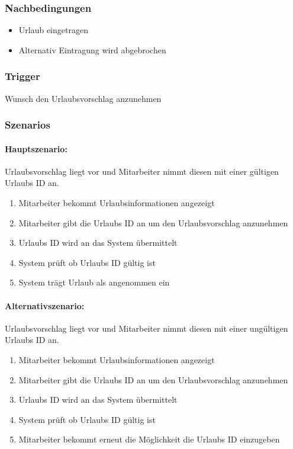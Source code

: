 \subsubsection{Nachbedingungen}
\begin{itemize}
	\item Urlaub eingetragen
	\item Alternativ Eintragung wird abgebrochen
\end{itemize}

\subsubsection{Trigger}
Wunsch den Urlaubsvorschlag anzunehmen

\subsubsection{Szenarios}
\paragraph{Hauptszenario:}
Urlaubsvorschlag liegt vor und Mitarbeiter nimmt diesen mit einer gültigen Urlaubs ID an.

\begin{enumerate}
	\item Mitarbeiter bekommt Urlaubsinformationen angezeigt
	\item Mitarbeiter gibt die Urlaubs ID an um den Urlaubsvorschlag anzunehmen
	\item Urlaubs ID wird an das System übermittelt
	\item System prüft ob Urlaubs ID gültig ist
	\item System trägt Urlaub als angenommen ein
\end{enumerate}



\paragraph{Alternativszenario:}
Urlaubsvorschlag liegt vor und Mitarbeiter nimmt diesen mit einer ungültigen Urlaubs ID an.

\begin{enumerate}
	\item Mitarbeiter bekommt Urlaubsinformationen angezeigt
	\item Mitarbeiter gibt die Urlaubs ID an um den Urlaubsvorschlag anzunehmen
	\item Urlaubs ID wird an das System übermittelt
	\item System prüft ob Urlaubs ID gültig ist
	\item Mitarbeiter bekommt erneut die Möglichkeit die Urlaubs ID einzugeben
\end{enumerate}


